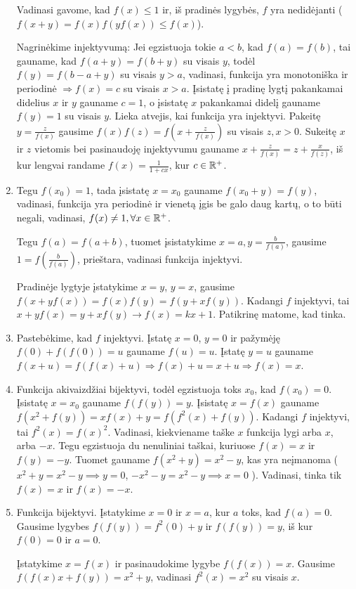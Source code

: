 \begin{enumerate}
Vadinasi gavome, kad $f(x)\leq 1$ ir, iš pradinės lygybės, $f$ yra
nedidėjanti ($f(x+y)=f(x)f(yf(x))\leq f(x)$).

Nagrinėkime injektyvumą: Jei egzistuoja tokie $a < b$, kad
$f(a)=f(b)$, tai gauname, kad $f(a+y)=f(b+y)$ su visais $y$, todėl
$f(y)=f(b-a+y)$ su visais $y>a$, vadinasi, funkcija yra monotoniška ir
periodinė $\Rightarrow f(x)= c$ su visais $x >a$. Įsistatę į pradinę
lygtį pakankamai didelius $x$ ir $y$ gauname $c = 1$, o įsistatę $x$
pakankamai didelį gauname $f(y)=1$ su visais $y$.
Lieka atvejis, kai funkcija yra injektyvi. Pakeitę $y=\frac{z}{f(x)}$
gausime $f(x)f(z)=f(x+\frac{z}{f(x)})$ su visais $z,x >0$. Sukeitę $x$
ir $z$ vietomis bei pasinaudoję injektyvumu gauname $x +
\frac{z}{f(x)} = z + \frac{x}{f(z)}$, iš kur lengvai randame
$f(x)=\frac{1}{1+cx}$, kur $c\in \mathbb R^+$.
\item 
Tegu $f(x_0)=1$, tada įsistatę $x=x_0$ gauname $f(x_0+y)=f(y)$,
vadinasi, funkcija yra periodinė ir vienetą įgis be galo daug kartų, o
to būti negali, vadinasi, $f(x)\neq 1, \forall x\in \mathbb R^+$.

Tegu $f(a)=f(a+b)$, tuomet įsistatykime $x=a, y=\frac{b}{f(a)}$,
gausime $1=f(\frac{b}{f(a)})$, prieštara, vadinasi funkcija injektyvi.

Pradinėje lygtyje įstatykime $x=y$, $y=x$, gausime
$f(x+yf(x))=f(x)f(y) =f(y+xf(y))$. Kadangi $f$ injektyvi, tai
$x+yf(x)=y+xf(y) \rightarrow f(x)=kx+1$. Patikrinę matome, kad tinka.
\item 
Pastebėkime, kad $f$ injektyvi.  Įstatę $x=0$, $y=0$ ir pažymėję
$f(0)+f(f(0))=u$ gauname $f(u)=u$.  Įstatę $y=u$ gauname
$f(x+u)=f(f(x)+u) \Rightarrow f(x)+u=x+u \Rightarrow f(x)=x$.
\item 
Funkcija akivaizdžiai bijektyvi, todėl egzistuoja toks $x_0$, kad
$f(x_0)=0$. Įsistatę $x=x_0$ gauname $f(f(y))=y$.  Įsistatę $x=f(x)$
gauname $f(x^2+f(y))=xf(x)+y=f(f^2(x)+f(y))$. Kadangi $f$ injektyvi,
tai $f^2(x)=f(x)^2$. Vadinasi, kiekviename taške $x$ funkcija lygi arba
$x$, arba $-x$. Tegu egzistuoja du nenuliniai taškai, kuriuose $f(x)=x$
ir $f(y)=-y$. Tuomet gauname $f(x^2+y)=x^2-y$, kas yra neįmanoma
($x^2+y = x^2-y\implies y=0$, $-x^2-y = x^2-y\implies x=0$ ).
Vadinasi, tinka tik $f(x)=x$ ir $f(x)=-x$.
\item 
Funkcija bijektyvi. Įstatykime $x=0$ ir $x=a$, kur $a$ toks, kad
$f(a)=0$. Gausime lygybes $f(f(y))=f^2(0) + y$ ir $f(f(y))=y$, iš kur
$f(0) = 0$ ir $a=0$.

Įstatykime $x = f(x)$ ir pasinaudokime lygybe $f(f(x))=x$. Gausime
$f(f(x)x + f(y))=x^2 + y$, vadinasi $f^2(x)=x^2$ su visais $x$.


\end{enumerate}
